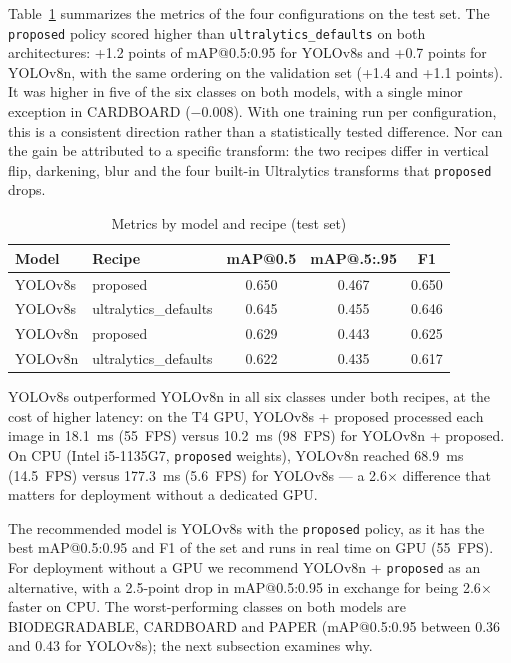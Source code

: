 \documentclass[conference]{IEEEtran}
\begin{document}
Table~\ref{tab:metrics} summarizes the metrics of the four configurations on the test set.
The \texttt{proposed} policy scored higher than \texttt{ultralytics\_defaults} on both
architectures: +1.2 points of mAP@0.5:0.95 for YOLOv8s and +0.7 points for YOLOv8n, with the
same ordering on the validation set (+1.4 and +1.1 points). It was
higher in five of the six classes on both models, with a single minor exception in CARDBOARD
($-$0.008). With one training run per configuration, this
is a consistent direction rather than a statistically tested difference. Nor can the gain be
attributed to a specific transform: the two recipes differ in vertical flip, darkening, blur
and the four built-in Ultralytics transforms that \texttt{proposed} drops.

\begin{table}[htbp]
\caption{Metrics by model and recipe (test set)}
\begin{center}
\begin{tabular}{llccc}
\toprule
\textbf{Model} & \textbf{Recipe} & \textbf{mAP@0.5} & \textbf{mAP@.5:.95} & \textbf{F1} \\
\midrule
YOLOv8s & proposed             & 0.650 & 0.467 & 0.650 \\
YOLOv8s & ultralytics\_defaults & 0.645 & 0.455 & 0.646 \\
YOLOv8n & proposed             & 0.629 & 0.443 & 0.625 \\
YOLOv8n & ultralytics\_defaults & 0.622 & 0.435 & 0.617 \\
\bottomrule
\end{tabular}
\label{tab:metrics}
\end{center}
\end{table}

YOLOv8s outperformed YOLOv8n in all six classes under both recipes, at the cost of higher
latency: on the T4 GPU, YOLOv8s + proposed processed each image in 18.1~ms (55~FPS) versus
10.2~ms (98~FPS) for YOLOv8n + proposed. On CPU (Intel i5-1135G7, \texttt{proposed} weights),
YOLOv8n reached 68.9~ms (14.5~FPS) versus 177.3~ms (5.6~FPS) for YOLOv8s --- a 2.6$\times$
difference that matters for deployment without a dedicated GPU.

The recommended model is YOLOv8s with the \texttt{proposed} policy, as it has the best
mAP@0.5:0.95 and F1 of the set and runs in real time on GPU (55~FPS). For deployment without
a GPU we recommend YOLOv8n + \texttt{proposed} as an alternative, with a 2.5-point drop in
mAP@0.5:0.95 in exchange for being 2.6$\times$ faster on CPU. The worst-performing classes on
both models are BIODEGRADABLE, CARDBOARD and PAPER (mAP@0.5:0.95 between 0.36 and 0.43 for
YOLOv8s); the next subsection examines why.
\end{document}
